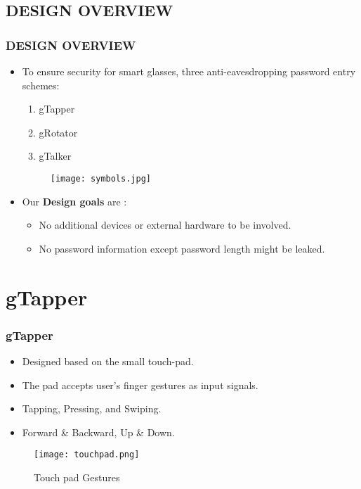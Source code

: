 \documentclass{beamer}
\begin{document}
\begin{frame}
\section{DESIGN OVERVIEW}
\frametitle{DESIGN OVERVIEW}


\begin{itemize}

\justifying

\item To ensure security for smart glasses, three anti-eavesdropping password entry schemes:
\begin{enumerate}
\item gTapper
\item gRotator
\item gTalker
\end{enumerate}
\begin{figure}
    \begin{center}
        \texttt{[image: symbols.jpg]}
    \end{center}
\end{figure}


\item  Our \textbf{Design goals} are :
\begin{itemize}
\item  No additional devices or external hardware to be
involved.
\item  No password information except password length might be leaked.
\end{itemize}


\end{itemize}
\end{frame}


\section{gTapper}
\begin{frame}
\frametitle{gTapper}

\begin{itemize}

\justifying

\item Designed based on the small touch-pad.

\item The pad accepts user's finger gestures as input signals.
\item  Tapping, Pressing, and Swiping.
\item  Forward \& Backward, Up \& Down.

\end{itemize}

\begin{figure}
    \begin{center}
        \texttt{[image: touchpad.png]}
        \caption{Touch pad Gestures}
    \end{center}
\end{figure}

\end{frame}
\end{document}
